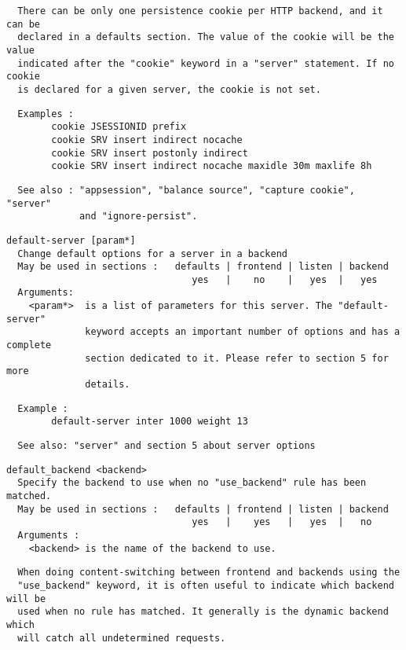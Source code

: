 \begin{verbatim}
  There can be only one persistence cookie per HTTP backend, and it can be
  declared in a defaults section. The value of the cookie will be the value
  indicated after the "cookie" keyword in a "server" statement. If no cookie
  is declared for a given server, the cookie is not set.
\end{verbatim}

\begin{verbatim}
  Examples :
        cookie JSESSIONID prefix
        cookie SRV insert indirect nocache
        cookie SRV insert postonly indirect
        cookie SRV insert indirect nocache maxidle 30m maxlife 8h
\end{verbatim}

\begin{verbatim}
  See also : "appsession", "balance source", "capture cookie", "server"
             and "ignore-persist".
\end{verbatim}

\begin{verbatim}
default-server [param*]
  Change default options for a server in a backend
  May be used in sections :   defaults | frontend | listen | backend
                                 yes   |    no    |   yes  |   yes
  Arguments:
    <param*>  is a list of parameters for this server. The "default-server"
              keyword accepts an important number of options and has a complete
              section dedicated to it. Please refer to section 5 for more
              details.
\end{verbatim}

\begin{verbatim}
  Example :
        default-server inter 1000 weight 13
\end{verbatim}

\begin{verbatim}
  See also: "server" and section 5 about server options
\end{verbatim}

\begin{verbatim}
default_backend <backend>
  Specify the backend to use when no "use_backend" rule has been matched.
  May be used in sections :   defaults | frontend | listen | backend
                                 yes   |    yes   |   yes  |   no
  Arguments :
    <backend> is the name of the backend to use.
\end{verbatim}

\begin{verbatim}
  When doing content-switching between frontend and backends using the
  "use_backend" keyword, it is often useful to indicate which backend will be
  used when no rule has matched. It generally is the dynamic backend which
  will catch all undetermined requests.
\end{verbatim}

